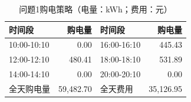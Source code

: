 \begin{table}[H]\centering\small\caption{问题1购电策略（电量：kWh；费用：元）}\label{tab:q1p}
\begin{tabular}{lrlr}\toprule
时间段 & 购电量 & 时间段 & 购电量\\\midrule
10:00-10:10 & 0.00 & 16:00-16:10 & 445.43\\
12:00-12:10 & 480.41 & 18:00-18:10 & 531.89\\
14:00-14:10 & 0.00 & 20:00-20:10 & 0.00\\
全天购电量 & 59,482.70 & 全天费用 & 35,126.95\\
\bottomrule\end{tabular}\end{table}
